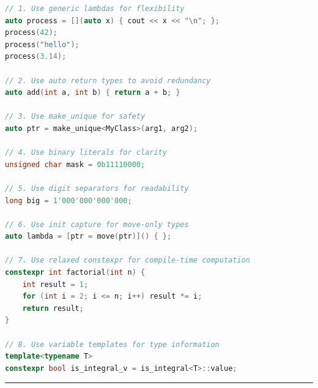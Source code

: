\begin{lstlisting}[language={C++}]
// 1. Use generic lambdas for flexibility
auto process = [](auto x) { cout << x << "\n"; };
process(42);
process("hello");
process(3.14);

// 2. Use auto return types to avoid redundancy
auto add(int a, int b) { return a + b; }

// 3. Use make_unique for safety
auto ptr = make_unique<MyClass>(arg1, arg2);

// 4. Use binary literals for clarity
unsigned char mask = 0b11110000;

// 5. Use digit separators for readability
long big = 1'000'000'000'000;

// 6. Use init capture for move-only types
auto lambda = [ptr = move(ptr)]() { };

// 7. Use relaxed constexpr for compile-time computation
constexpr int factorial(int n) {
    int result = 1;
    for (int i = 2; i <= n; i++) result *= i;
    return result;
}

// 8. Use variable templates for type information
template<typename T>
constexpr bool is_integral_v = is_integral<T>::value;
\end{lstlisting}

\begin{center}\rule{0.5\linewidth}{0.5pt}\end{center}
